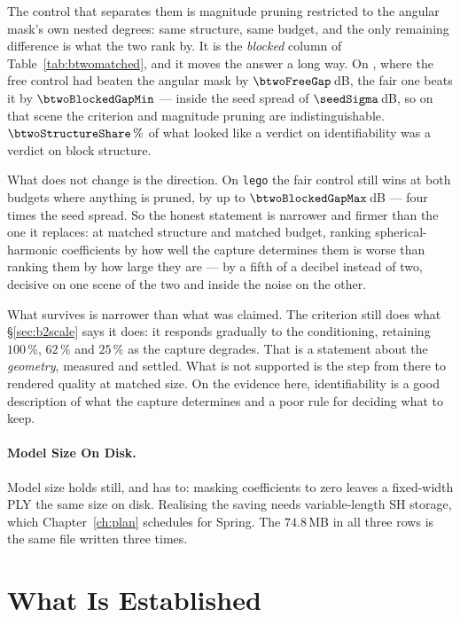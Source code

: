 The control that separates them is magnitude pruning restricted to the angular mask's own
nested degrees: same structure, same budget, and the only remaining difference
is what the two rank by. It is the \emph{blocked} column of
Table~\ref{tab:btwomatched}, and it moves the answer a long way. On
\btwoStructureScene, where the free control had beaten the angular mask by
$\btwoFreeGap$\,dB, the fair one beats it by $\btwoBlockedGapMin$ --- inside the
seed spread of $\seedSigma$\,dB, so on that scene the criterion and magnitude pruning are indistinguishable. $\btwoStructureShare\,\%$ of what looked
like a verdict on identifiability was a verdict on block structure.

What does not change is the direction. On \texttt{lego} the fair control still
wins at both budgets where anything is pruned, by up to
$\btwoBlockedGapMax$\,dB --- four times the seed spread. So the honest statement is narrower and
firmer than the one it replaces: at matched structure and matched budget,
ranking spherical-harmonic coefficients by how well the capture determines them
is worse than ranking them by how large they are --- by a fifth of a decibel
instead of two, decisive on one scene of the two and inside the noise on the
other.

What survives is narrower than what was claimed. The criterion still does what \S\ref{sec:b2scale} says it does: it responds
gradually to the conditioning, retaining $100\,\%$, $62\,\%$ and $25\,\%$ as the
capture degrades. That is a statement about the \emph{geometry}, measured and settled. What is not
supported is the step from there to rendered quality at matched size. On the
evidence here, identifiability is a good description of what the capture
determines and a poor rule for deciding what to keep.

\paragraph{Model Size On Disk.} Model size holds still, and has to: masking coefficients to zero leaves a fixed-width PLY the same size on
disk. Realising the saving needs variable-length SH storage, which
Chapter~\ref{ch:plan} schedules for Spring. The $74.8$\,MB in all three rows is
the same file written three times.

\section{What Is Established}

